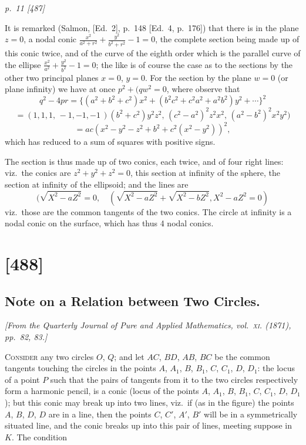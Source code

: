 \documentclass[11pt,a4paper]{article}
\theoremstyle{plain}
\theoremstyle{definition}
\begin{document}
\clearpage

\bigskip
\textit{p.~11 [487]}
\smallskip

It is remarked (Salmon, [Ed.\ 2], p.~148 [Ed.\ 4, p.~176]) that there is in the plane
$z = 0$, a nodal conic $\frac{x^2}{a^2 + r^2} + \frac{y^2}{b^2 + r^2} - 1 = 0$, the complete section being made up
of this conic twice, and of the curve of the eighth order which is the parallel curve
of the ellipse $\frac{x^2}{a^2} + \frac{y^2}{b^2} - 1 = 0$; the like is of course the case as to the sections by
the other two principal planes $x = 0$, $y = 0$.  For the section by the plane $w = 0$
(or plane infinity) we have at once $p^2 + (q w^2 = 0$, where observe that
\[
q^2 - 4pr = \{(a^2 + b^2 + c^2)x^2 + (b^2 c^2 + c^2 a^2 + a^2 b^2)y^2 + \cdots\}^2
\]
\[
= (1, 1, 1, \, -1, -1, -1 \,)(b^2 + c^2)y^2 z^2, \, (c^2 - a^2)^2 z^2 x^2, \, (a^2 - b^2)^2 x^2 y^2)
\]
\[
= ac (x^2 - y^2 - z^2 + b^2 + c^2 (x^2 - y^2))^2,
\]
which has reduced to a sum of squares with positive signs.

The section is thus made up of two conics, each twice, and of four right lines: viz.\
the conics are $z^2 + y^2 + z^2 = 0$, this section at infinity of the sphere, the section at
infinity of the ellipsoid; and the lines are
\[
(\sqrt{X^2 - aZ^2} = 0, \quad (\sqrt{X^2 - aZ^2} + \sqrt{X^2 - bZ^2}, X^2 - aZ^2 = 0)
\]
viz.\ those are the common tangents of the two conics.  The circle at infinity is a nodal conic on the surface, which has thus 4 nodal conics.

\clearpage

\section{[488]}
\subsection{Note on a Relation between Two Circles.}

\begin{center}
\textit{[From the Quarterly Journal of Pure and Applied Mathematics, vol.~\textsc{xi}. (1871), pp.~82, 83.]}
\end{center}

\textsc{Consider} any two circles $O$, $Q$; and let $AC$, $BD$, $AB$, $BC$ be the common
tangents touching the circles in the points $A$, $A_1$, $B$, $B_1$, $C$, $C_1$, $D$, $D_1$: the locus of
a point $P$ such that the pairs of tangents from it to the two circles respectively form
a harmonic pencil, is a conic (locus of the points $A$, $A_1$, $B$, $B_1$, $C$, $C_1$, $D$, $D_1$); but this conic may break up into two lines, viz.\ if (as in the figure) the points $A$, $B$, $D$, $D$
are in a line, then the points $C$, $C'$, $A'$, $B'$ will be in a symmetrically situated line,
and the conic breaks up into this pair of lines, meeting suppose in $K$.  The condition
\end{document}

